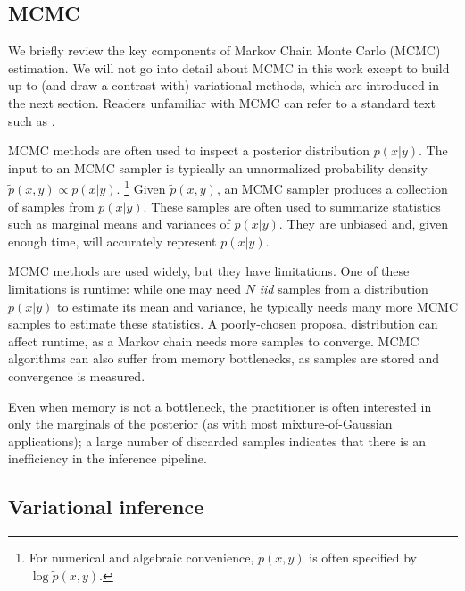 \subsection{MCMC}


We briefly review the key components of Markov Chain Monte Carlo
(MCMC) estimation.  We will not go into detail about MCMC in this work
except to build up to (and draw a contrast with) variational methods,
which are introduced in the next section. Readers unfamiliar with MCMC
can refer to a standard text such as \cite{bishop:2006}.


MCMC methods are often used to inspect a posterior distribution $p(x |
y)$.  The input to an MCMC sampler is typically an unnormalized
probability density $\tilde p(x, y) \propto p(x | y)$. \footnote{For
  numerical and algebraic convenience, $\tilde p(x, y)$ is often
  specified by $\log \tilde p(x, y)$.}  Given $\tilde p(x, y)$, an
MCMC sampler produces a collection of samples from $p(x | y)$.  These
samples are often used to summarize statistics such as marginal means
and variances of $p(x | y)$.  They are unbiased and, given enough
time, will accurately represent $p(x | y)$.

MCMC methods are used widely, but they have limitations.
One of these limitations is runtime: while one may need $N$ \emph{iid}
samples from a distribution $p(x | y)$ to estimate its mean and
variance, he typically needs many more MCMC samples to estimate these
statistics.  A poorly-chosen proposal distribution can affect runtime,
as a Markov chain needs more samples to converge. MCMC algorithms can
also suffer from memory bottlenecks, as samples are stored and
convergence is measured.

Even when memory is not a bottleneck, the practitioner is often
interested in only the marginals of the posterior (as with most
mixture-of-Gaussian applications); a large number of discarded samples
indicates that there is an inefficiency in the inference pipeline.

\subsection{Variational inference}
\label{sec:variational_inference}


